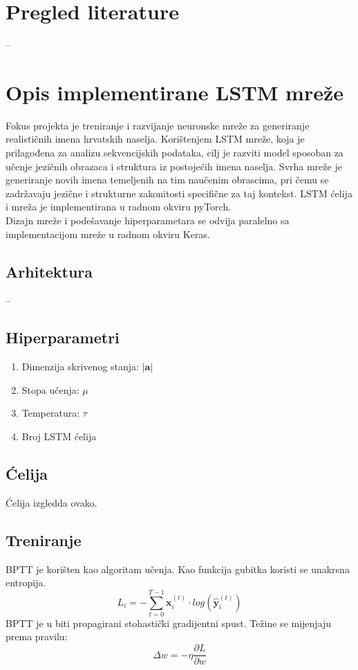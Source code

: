 \documentclass[conference]{IEEEtran}
\begin{document}
\section{Pregled literature}
--

\section{Opis implementirane LSTM mreže}
Fokus projekta je treniranje i razvijanje neuronske mreže za generiranje realističnih imena hrvatskih naselja. Korištenjem LSTM mreže, koja je prilagođena za analizu sekvencijskih podataka, cilj je razviti model sposoban za učenje jezičnih obrazaca i struktura iz postojećih imena naselja. Svrha mreže je generiranje novih imena temeljenih na tim naučenim obrascima, pri čemu se zadržavaju jezične i strukturne zakonitosti specifične za taj kontekst.
LSTM ćelija i mreža je implementirana u radnom okviru pyTorch.\\
Dizajn mreže i podešavanje hiperparametara se odvija paralelno sa implementacijom mreže u radnom okviru Keras.

\subsection{Arhitektura}
--

\subsection{Hiperparametri}
\label{subsect_hiper}
\begin{enumerate}
\item Dimenzija skrivenog stanja: $\lvert \mathbf{a} \rvert$
\item Stopa učenja: $\mu$
\item Temperatura: $\tau$
\item Broj LSTM ćelija
\end{enumerate}

\subsection{Ćelija}
Ćelija izgledda ovako.

\subsection{Treniranje}
BPTT je korišten kao algoritam učenja.
Kao funkcija gubitka koristi se unakrsna entropija.
\begin{equation}
L_i = - \sum_{t = 0}^{T-1} \mathbf{x}_i^{(t)} \cdot log(\hat{\mathbf{y}}_i^{(t)})
\end{equation}
BPTT je u biti propagirani stohastički gradijentni spust.
Težine se mijenjaju prema pravilu:
\begin{equation}
\Delta w = - \eta \frac{\partial L}{\partial w}
\end{equation}
\end{document}
